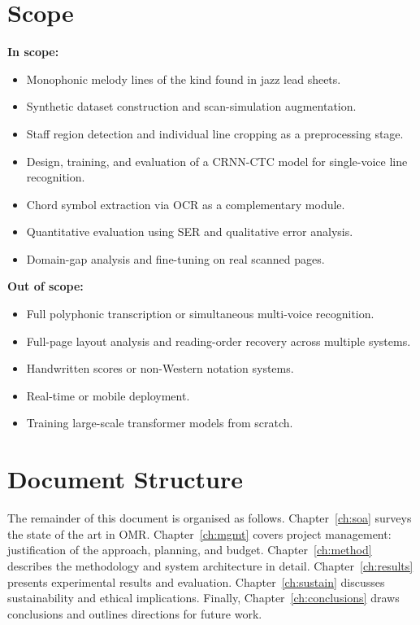 \documentclass[11pt, a4paper]{report}
\begin{document}
\section{Scope}

\textbf{In scope:}
\begin{itemize}
    \item Monophonic melody lines of the kind found in jazz lead sheets.
    \item Synthetic dataset construction and scan-simulation augmentation.
    \item Staff region detection and individual line cropping as a preprocessing stage.
    \item Design, training, and evaluation of a CRNN-CTC model for single-voice line recognition.
    \item Chord symbol extraction via OCR as a complementary module.
    \item Quantitative evaluation using SER and qualitative error analysis.
    \item Domain-gap analysis and fine-tuning on real scanned pages.
\end{itemize}

\textbf{Out of scope:}
\begin{itemize}
    \item Full polyphonic transcription or simultaneous multi-voice recognition.
    \item Full-page layout analysis and reading-order recovery across multiple systems.
    \item Handwritten scores or non-Western notation systems.
    \item Real-time or mobile deployment.
    \item Training large-scale transformer models from scratch.
\end{itemize}

\section{Document Structure}

The remainder of this document is organised as follows. Chapter~\ref{ch:soa} surveys the state of the art in OMR. Chapter~\ref{ch:mgmt} covers project management: justification of the approach, planning, and budget. Chapter~\ref{ch:method} describes the methodology and system architecture in detail. Chapter~\ref{ch:results} presents experimental results and evaluation. Chapter~\ref{ch:sustain} discusses sustainability and ethical implications. Finally, Chapter~\ref{ch:conclusions} draws conclusions and outlines directions for future work.
\end{document}
